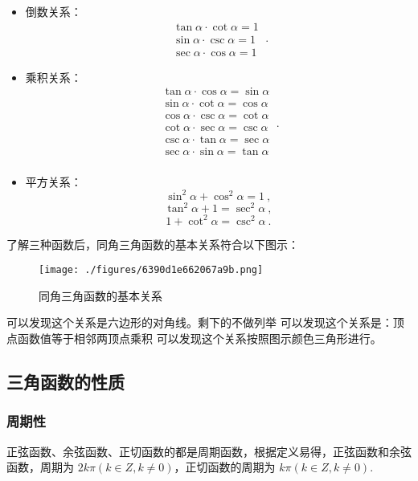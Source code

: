 \begin{itemize}
\item 倒数关系：
\begin{equation}
\begin{split}
\tan \alpha \cdot \cot \alpha = 1\\
\sin \alpha \cdot  \csc \alpha = 1\\
\sec \alpha  \cdot \cos \alpha = 1
\end{split}~.
\end{equation}
\item 乘积关系：
\begin{equation}
\begin{split}
\tan \alpha \cdot\cos \alpha= \sin \alpha\\
\sin \alpha \cdot\cot \alpha= \cos \alpha\\
\cos \alpha \cdot\csc \alpha= \cot \alpha\\
\cot \alpha \cdot\sec \alpha= \csc \alpha\\
\csc \alpha \cdot\tan \alpha= \sec \alpha\\
\sec \alpha \cdot\sin \alpha= \tan \alpha\\
\end{split}~.
\end{equation}
\item 平方关系：
\begin{equation}
\sin ^{2} \alpha + \cos ^{2}\alpha =1~,
\end{equation}
\begin{equation}
\tan  ^{2} \alpha + 1 =\sec ^{2}\alpha~,
\end{equation}
\begin{equation}
1 + \cot ^{2}\alpha =\csc ^{2}\alpha~.
\end{equation}
\end{itemize}
了解三种函数后，同角三角函数的基本关系符合以下图示：
\begin{figure}[ht]
\centering
\texttt{[image: ./figures/6390d1e662067a9b.png]}
\caption{同角三角函数的基本关系} \label{fig_HsTrFu_4}
\end{figure}
可以发现这个关系是六边形的对角线。剩下的不做列举
可以发现这个关系是：顶点函数值等于相邻两顶点乘积
可以发现这个关系按照图示颜色三角形进行。
\subsection{三角函数的性质}

\subsubsection{周期性}
正弦函数、余弦函数、正切函数的都是周期函数，根据定义易得，正弦函数和余弦函数，周期为 $2k\pi(k\in Z,k\neq0)$，正切函数的周期为 $k\pi(k\in Z,k\neq0)$.
